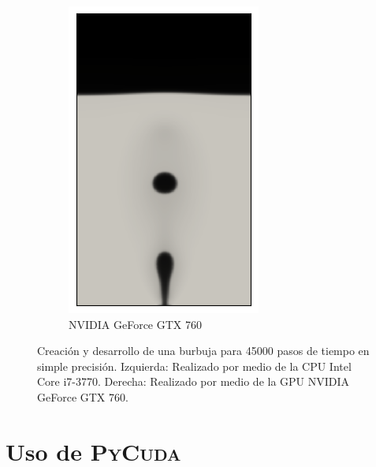 \begin{figure}[H]
\begin{subfigure}{0.35\textwidth}
		\includegraphics[width=\linewidth]{figs/cap4/cuda_bb_760_s45}
		\caption{NVIDIA GeForce GTX 760}
		\label{fig:b_dp_760}\hfil
	\end{subfigure}
	
	\caption{Creación y desarrollo de una burbuja para 45000 pasos de tiempo en simple precisión. Izquierda: Realizado por medio de la CPU Intel Core i7-3770. Derecha: Realizado por medio de la GPU NVIDIA GeForce GTX 760.}
	\label{fig:bb_CPU_GPU_simple}
\end{figure}
\newpage

\section{Uso de \textsc{PyCuda}}

